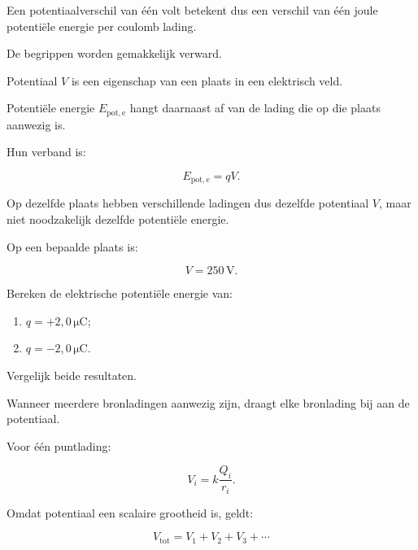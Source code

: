 \documentclass{ximera}
\begin{document}
Een potentiaalverschil van één volt betekent dus een verschil van één
joule potentiële energie per coulomb lading.




De begrippen worden gemakkelijk verward.

Potentiaal $V$ is een eigenschap van een plaats in een elektrisch veld.

Potentiële energie $E_{\mathrm{pot,e}}$ hangt daarnaast af van de
lading die op die plaats aanwezig is.

Hun verband is:

\[
\boxed{
E_{\mathrm{pot,e}}=qV.
}
\]


Op dezelfde plaats hebben verschillende ladingen dus dezelfde
potentiaal $V$, maar niet noodzakelijk dezelfde potentiële energie.


\begin{oefening}{\oefB\ESS}

Op een bepaalde plaats is:

\[
V=250\,\mathrm V.
\]

Bereken de elektrische potentiële energie van:

\begin{enumerate}
  \item $q=+2{,}0\,\mathrm{\mu C}$;
  \item $q=-2{,}0\,\mathrm{\mu C}$.
\end{enumerate}

Vergelijk beide resultaten.

\end{oefening}




Wanneer meerdere bronladingen aanwezig zijn, draagt elke bronlading bij
aan de potentiaal.

Voor één puntlading:

\[
V_i
=
k\frac{Q_i}{r_i}.
\]

Omdat potentiaal een scalaire grootheid is, geldt:

\[
\boxed{
V_\mathrm{tot}
=
V_1+V_2+V_3+\cdots
}
\]
\end{document}
